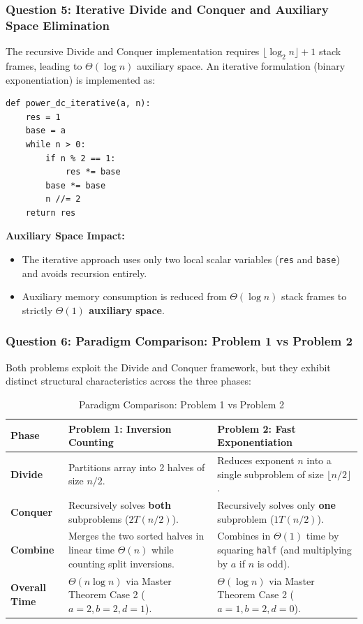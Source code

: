 \documentclass[12pt]{article}
\begin{document}
\subsubsection{Question 5: Iterative Divide and Conquer and Auxiliary Space Elimination}
The recursive Divide and Conquer implementation requires $\lfloor \log_2 n \rfloor + 1$ stack frames, leading to $\Theta(\log n)$ auxiliary space. An iterative formulation (binary exponentiation) is implemented as:

\begin{lstlisting}[style=code, caption={Iterative Binary Exponentiation}]
def power_dc_iterative(a, n):
    res = 1
    base = a
    while n > 0:
        if n % 2 == 1:
            res *= base
        base *= base
        n //= 2
    return res
\end{lstlisting}

\textbf{Auxiliary Space Impact:}
\begin{itemize}
    \item The iterative approach uses only two local scalar variables (\texttt{res} and \texttt{base}) and avoids recursion entirely.
    \item Auxiliary memory consumption is reduced from $\Theta(\log n)$ stack frames to strictly \textbf{$\Theta(1)$ auxiliary space}.
\end{itemize}

\subsubsection{Question 6: Paradigm Comparison: Problem 1 vs Problem 2}
Both problems exploit the Divide and Conquer framework, but they exhibit distinct structural characteristics across the three phases:

\begin{table}[H]
\centering
\caption{Paradigm Comparison: Problem 1 vs Problem 2}
\label{tab:paradigm_comp}
\vspace{0.2cm}
\begin{tabular}{p{2.2cm}p{6.3cm}p{6.3cm}}
\toprule
\textbf{Phase} & \textbf{Problem 1: Inversion Counting} & \textbf{Problem 2: Fast Exponentiation} \\
\midrule
\textbf{Divide} & Partitions array into 2 halves of size $n/2$. & Reduces exponent $n$ into a single subproblem of size $\lfloor n/2 \rfloor$. \\
\addlinespace
\textbf{Conquer} & Recursively solves \textbf{both} subproblems ($2T(n/2)$). & Recursively solves only \textbf{one} subproblem ($1T(n/2)$). \\
\addlinespace
\textbf{Combine} & Merges the two sorted halves in linear time $\Theta(n)$ while counting split inversions. & Combines in $\Theta(1)$ time by squaring \texttt{half} (and multiplying by $a$ if $n$ is odd). \\
\addlinespace
\textbf{Overall Time} & $\Theta(n \log n)$ via Master Theorem Case 2 ($a=2, b=2, d=1$). & $\Theta(\log n)$ via Master Theorem Case 2 ($a=1, b=2, d=0$). \\
\bottomrule
\end{tabular}
\end{table}
\end{document}
